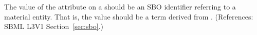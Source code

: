 The value of the  attribute on a \Compartment should be an SBO
identifier referring to a material entity.  That is, the value
should be a term derived from \sbomaterialentity.  (References: 
SBML L3V1 Section~\ref{sec:sbo}.)
